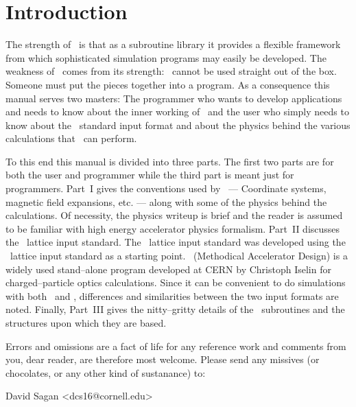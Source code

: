 \section*{Introduction}

The strength of \bmad\ is that as a subroutine library it provides a
flexible framework from which sophisticated simulation programs may
easily be developed.  The weakness of \bmad\ comes from its strength:
\bmad\ cannot be used straight out of the box. Someone must put the
pieces together into a program. As a consequence this manual serves
two masters: The programmer who wants to develop applications and
needs to know about the inner working of \bmad\ and the user who simply 
needs to know about
the \bmad\ standard input format and about the physics behind the various
calculations that \bmad\ can perform.

To this end this manual is divided into three parts. The first two
parts are for both the user and programmer while the third part is
meant just for programmers. Part~I gives the conventions used by
\bmad\ --- Coordinate systems, magnetic field expansions, etc. ---
along with some of the physics behind the calculations. Of necessity,
the physics writeup is brief and the reader is assumed to be familiar
with high energy accelerator physics formalism. Part~II discusses the
\bmad\ lattice input standard.  The \bmad\ lattice input standard was
developed using the \mad\ lattice input standard as a starting
point. \mad\ (Methodical Accelerator Design) is a widely used
stand--alone program developed at CERN by Christoph Iselin for
charged--particle optics calculations. Since it can be convenient
to do simulations with both \mad\ and \bmad, differences and
similarities between the two input formats are noted. 
Finally, Part~III gives the nitty--gritty details of the \bmad\
subroutines and the structures upon which they are based.

Errors and omissions are a fact of life for any reference work and
comments from you, dear reader, are therefore most welcome. Please
send any missives (or chocolates, or any other kind of sustanance) to:
\begin{example}
  David Sagan <dcs16@cornell.edu>
\end{example}
